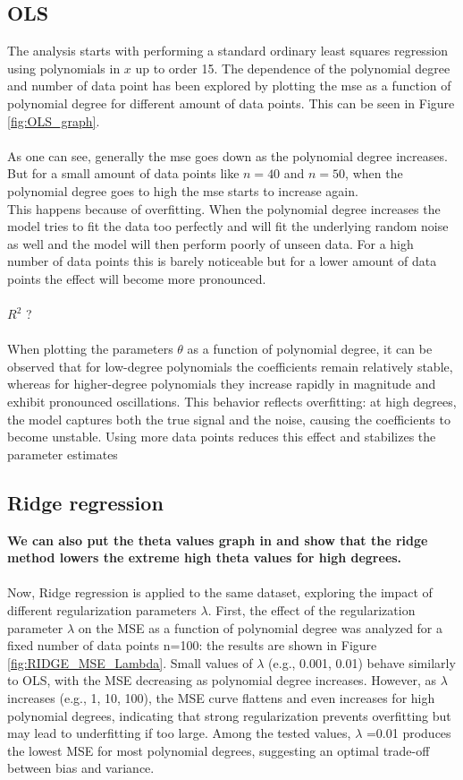 \documentclass[
 reprint,            %
 amsmath,amssymb,
 aps,
]{revtex4-2}
\begin{document}
\subsection{OLS}
\label{OLS}
The analysis starts with performing a standard ordinary least squares regression using polynomials in $x$ up to order 15. The dependence of the polynomial degree and number of data point has been explored by plotting the mse as a function of polynomial degree for different amount of data points. This can be seen in Figure \ref{fig:OLS_graph}.\\\\
As one can see, generally the mse goes down as the polynomial degree increases. But for a small amount of data points like $n = 40$ and $n = 50$, when the polynomial degree goes to high the mse starts to increase again.\\
This happens because of overfitting. When the polynomial degree increases the model tries to fit the data too perfectly and will fit the underlying random noise as well and the model will then perform poorly of unseen data. For a high number of data points this is barely noticeable but for a lower amount of data points the effect will become more pronounced.\\\\
$R^2$ ?\\\\
When plotting the parameters $\theta$ as a function of polynomial degree, it can be observed that for low-degree polynomials the coefficients remain relatively stable, whereas for higher-degree polynomials they increase rapidly in magnitude and exhibit pronounced oscillations.
This behavior reflects overfitting: at high degrees, the model captures both the true signal and the noise, causing the coefficients to become unstable. Using more data points reduces this effect and stabilizes the parameter estimates
    


\subsection{Ridge regression}
\label{Ridge regression}
\textbf{We can also put the theta values graph in and show that the ridge method lowers the extreme high theta values for high degrees.}\\\\
Now, Ridge regression is applied to the same dataset, exploring the impact of different regularization parameters $\lambda$. First, the effect of the regularization parameter $\lambda $ on the MSE as a function of polynomial degree was analyzed for a fixed number of data points n=100: the results are shown in Figure \ref{fig:RIDGE_MSE_Lambda}.
Small values of $\lambda$ (e.g., 0.001, 0.01) behave similarly to OLS, with the MSE decreasing as polynomial degree increases. However, as $\lambda$ increases (e.g., 1, 10, 100), the MSE curve flattens and even increases for high polynomial degrees, indicating that strong regularization prevents overfitting but may lead to underfitting if too large.
Among the tested values, $\lambda$ =0.01 produces the lowest MSE for most polynomial degrees, suggesting an optimal trade-off between bias and variance.
\end{document}
